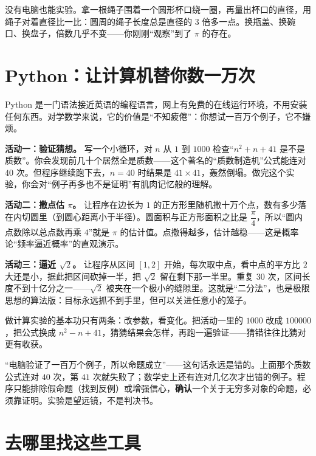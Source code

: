 \begin{shiyan}
没有电脑也能实验。拿一根绳子围着一个圆形杯口绕一圈，再量出杯口的直径，用绳子对着直径比一比：圆周的绳子长度总是直径的 $3$ 倍多一点。换瓶盖、换碗口、换盘子，倍数几乎不变——你刚刚“观察”到了 $\pi$ 的存在。
\end{shiyan}

\section{Python：让计算机替你数一万次}

Python 是一门语法接近英语的编程语言，网上有免费的在线运行环境，不用安装任何东西。对学数学来说，它的价值是“不知疲倦”：你想试一百万个例子，它不嫌烦。

\textbf{活动一：验证猜想。} 写一个小循环，对 $n$ 从 $1$ 到 $1000$ 检查“$n^2+n+41$ 是不是质数”。你会发现前几十个居然全是质数——这个著名的“质数制造机”公式能连对 $40$ 次。但程序继续跑下去，$n=40$ 时结果是 $41\times41$，轰然倒塌。做完这个实验，你会对“例子再多也不是证明”有肌肉记忆般的理解。

\textbf{活动二：撒点估 $\pi$。} 让程序在边长为 $1$ 的正方形里随机撒十万个点，数有多少落在内切圆里（到圆心距离小于半径）。圆面积与正方形面积之比是 $\dfrac{\pi}{4}$，所以“圆内点数除以总点数再乘 $4$”就是 $\pi$ 的估计值。点撒得越多，估计越稳——这是概率论“频率逼近概率”的直观演示。

\textbf{活动三：逼近 $\sqrt{2}$。} 让程序从区间 $[1,2]$ 开始，每次取中点，看中点的平方比 $2$ 大还是小，据此把区间砍掉一半，把 $\sqrt{2}$ 留在剩下那一半里。重复 $30$ 次，区间长度不到十亿分之一——$\sqrt{2}$ 被夹在一个极小的缝隙里。这就是“二分法”，也是极限思想的算法版：目标永远抓不到手里，但可以关进任意小的笼子。

做计算实验的基本功只有两条：改参数，看变化。把活动一里的 $1000$ 改成 $100000$，把公式换成 $n^2-n+41$，猜猜结果会怎样，再跑一遍验证——猜错往往比猜对更有收获。

\begin{fanli}
“电脑验证了一百万个例子，所以命题成立”——这句话永远是错的。上面那个质数公式连对 $40$ 次，第 $41$ 次就失败了；数学史上还有连对几亿次才出错的例子。程序只能排除假命题（找到反例）或增强信心，\textbf{确认}一个关于无穷多对象的命题，必须靠证明。实验是望远镜，不是判决书。
\end{fanli}

\section{去哪里找这些工具}

